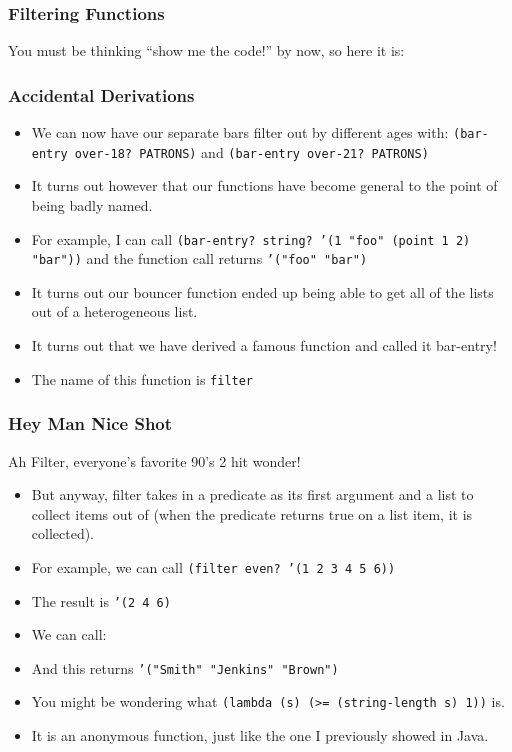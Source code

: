 \documentclass{beamer}
\begin{document}
\begin{frame}
  \frametitle{Filtering Functions}
  You must be thinking ``show me the code!'' by now, so here it is:
  \BarFilter
\end{frame}

\begin{frame}
  \frametitle{Accidental Derivations}
  \begin{itemize}
  \item<2-> We can now have our separate bars filter out by different ages
    with: \texttt{(bar-entry over-18? PATRONS)}
    and \texttt{(bar-entry over-21? PATRONS)}
  \item<3-> It turns out however that our functions have become general to
    the point of being badly named.
  \item<4-> For example, I can call \texttt{(bar-entry? string? '(1 "foo" (point 1 2) "bar"))} and the function call returns
    \texttt{'("foo" "bar")}
  \item<5-> It turns out our bouncer function ended up being able to get all of
    the lists out of a heterogeneous list.
  \item<6-> It turns out that we have derived a famous function and called it
    bar-entry!
  \item<7-> The name of this function is \texttt{filter}
  \end{itemize}
\end{frame}


\begin{frame}
  \frametitle{Hey Man Nice Shot}
  Ah Filter, everyone's favorite 90's 2 hit wonder!
  \begin{itemize}
  \item<2-> But anyway, filter takes in a predicate as its first argument
    and a list to collect items out of (when the predicate returns true on a list item, it is collected).
  \item<3-> For example, we can call \texttt{(filter even? '(1 2 3 4 5 6))}
  \item<4-> The result is \texttt{'(2 4 6)}
  \item<5-> We can call: \FilterString
  \item<6-> And this returns \texttt{'("Smith" "Jenkins" "Brown")}
  \item<7-> You might be wondering what \texttt{(lambda (s) (>= (string-length s) 1))} is.
  \item<8-> It is an anonymous function, just like the one I previously
    showed in Java.
  \end{itemize}
\end{frame}
\end{document}
